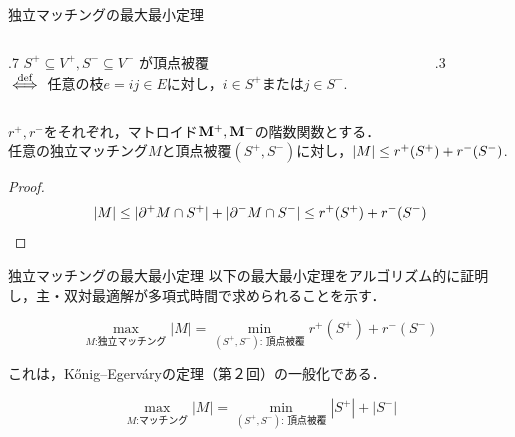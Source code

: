 \documentclass[14pt,aspectratio=169,xcolor=dvipsnames,table,onlytextwidth,dvipdfmx]{beamer}
\begin{document}
\begin{frame}{独立マッチングの最大最小定理}
    \small
    \begin{columns}[]
    \begin{column}{.7\textwidth}
        $S^+ \subseteq V^+, S^- \subseteq V^-$ が\alert{頂点被覆} \\
        $\overset{\text{def}}{\iff}$ 任意の枝$e = ij \in E$に対し，$i \in S^+$または$j \in S^-$.
    \end{column}
    \begin{column}{.3\textwidth}
        \centering
        \footnotesize
    \end{column}
    \end{columns}

    \begin{lemma}[弱双対性]
        $r^+, r^-$をそれぞれ，マトロイド$\mathbf{M}^+, \mathbf{M}^-$の階数関数とする．\\
        任意の独立マッチング$M$と頂点被覆$(S^+,S^-)$に対し，$\lvert M\rvert \leq r^+(S^+) + r^-(S^-)$.
    \end{lemma}
    \begin{proof}
    \[
        \lvert M\rvert \leq \lvert\partial^+ M \cap S^+\rvert + \lvert\partial^- M \cap S^-\rvert  \leq r^+(S^+) + r^-(S^-) 
    \]
    \end{proof}
\end{frame}

\begin{frame}{独立マッチングの最大最小定理}
     以下の最大最小定理をアルゴリズム的に証明し，主・双対最適解が多項式時間で求められることを示す．
    \begin{theorem}[Welsh (1970)]
        \[
            \max_{\text{$M$:独立マッチング}} |M| = \min_{\text{$(S^+,S^-)$: 頂点被覆}} r^+(S^+) + r^-(S^-)
        \]
    \end{theorem}

    \vfill
    これは，K\H{o}nig--Egerv\'aryの定理（第２回）の一般化である．
    \small
    \begin{theorem}
        \[
            \max_{\text{$M$:マッチング}} |M| = \min_{\text{$(S^+,S^-)$: 頂点被覆}} |S^+| + |S^-|
        \]
    \end{theorem}
\end{frame}
\end{document}
